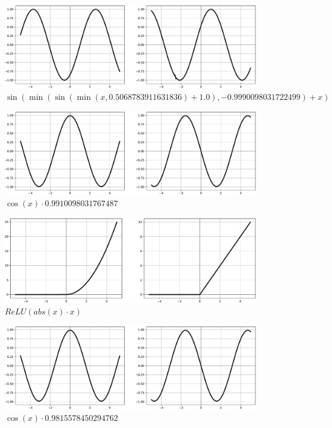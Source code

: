 \documentclass[times, utf8, numeric, diplomski]{fer}
\begin{document}
\begin{figure}[H]
\includegraphics[width=\textwidth]{dpav4_gp_f1.pdf}
\centering
\caption{$\sin (\min (\sin (\min (x,0.5068783911631836) + 1.0),-0.9990098031722499) + x)$}
\label{fig:dpav4_gp_f1}
\end{figure}
\begin{figure}[H]
\includegraphics[width=\textwidth]{dpav4_gp_f2.pdf}
\centering
\caption{$\cos (x) \cdot 0.9910098031767487$}
\label{fig:dpav4_gp_f2}
\end{figure}
\begin{figure}[H]
\includegraphics[width=\textwidth]{dpav4_gp_f3.pdf}
\centering
\caption{$ReLU (abs (x) \cdot x)$}
\label{fig:dpav4_gp_f3}
\end{figure}
\begin{figure}[H]
\includegraphics[width=\textwidth]{dpav4_gp_f4.pdf}
\centering
\caption{$\cos (x) \cdot 0.9815578450294762$}
\label{fig:dpav4_gp_f4}
\end{figure}
\end{document}
